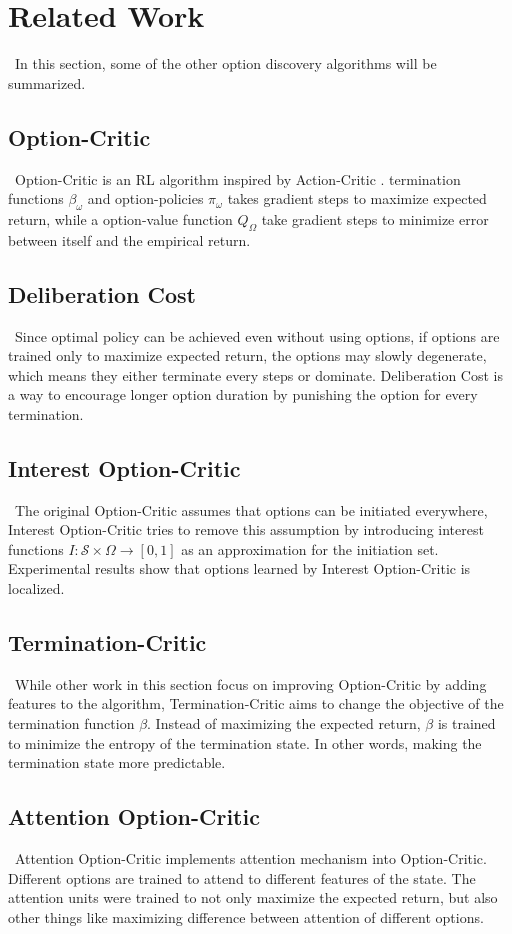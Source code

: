 \documentclass{article}
\begin{document}
	\section{Related Work}
	\qquad \ In this section, some of the other option discovery algorithms will be summarized.
	\subsection*{Option-Critic}
	\qquad \ Option-Critic \cite{bacon2016optioncritic} is an RL algorithm inspired by Action-Critic \cite{Konda00actor-criticalgorithms}. termination functions $\beta_\omega$ and option-policies $\pi_\omega$ takes gradient steps to maximize expected return, while a option-value function $Q_\Omega$ take gradient steps to minimize error between itself and the empirical return.
	\subsection*{Deliberation Cost}
	\qquad \ Since optimal policy can be achieved even without using options, if options are trained only to maximize expected return, the options may slowly degenerate, which means they either terminate every steps or dominate. Deliberation Cost \cite{harb2017waiting} is a way to encourage longer option duration by punishing the option for every termination.
	\subsection*{Interest Option-Critic}
	\qquad \ The original Option-Critic assumes that options can be initiated everywhere, Interest Option-Critic \cite{khetarpal2020options} tries to remove this assumption by introducing interest functions $I:\mathcal{S} \times \Omega \rightarrow [0,1]$ as an approximation for the initiation set. Experimental results show that options learned by Interest Option-Critic is localized.
	\subsection*{Termination-Critic}
	\qquad \ While other work in this section focus on improving Option-Critic by adding features to the algorithm, Termination-Critic \cite{harutyunyan2019termination} aims to change the objective of the termination function $\beta$. Instead of maximizing the expected return, $\beta$ is trained to minimize the entropy of the termination state. In other words, making the termination state more predictable.
	\subsection*{Attention Option-Critic}
	\qquad \ Attention Option-Critic \cite{attentionoptioncritic} implements attention mechanism into Option-Critic. Different options are trained to attend to different features of the state. The attention units were trained to not only maximize the expected return, but also other things like maximizing difference between attention of different options.
\end{document}
